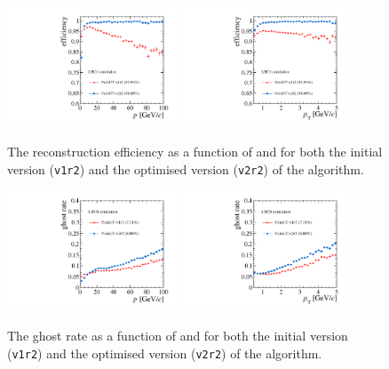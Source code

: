 \begin{figure}[!tb]
\centering
\includegraphics[width=0.45\textwidth]{figs/upstream-tracking-upgrade/eff_p_comp.pdf}
\includegraphics[width=0.45\textwidth]{figs/upstream-tracking-upgrade/eff_pt_comp.pdf}
\caption{The reconstruction efficiency as a function of \ptot and \pt for both the initial version (\texttt{v1r2}) and the optimised version (\texttt{v2r2}) of the \velout algorithm.}
\label{fig:eff_velout_comp}
\end{figure}

\begin{figure}[!tb]
\centering
\includegraphics[width=0.45\textwidth]{figs/upstream-tracking-upgrade/gr_p_comp.pdf}
\includegraphics[width=0.45\textwidth]{figs/upstream-tracking-upgrade/gr_pt_comp.pdf}
\caption{The ghost rate as a function of \ptot and \pt for both the initial version (\texttt{v1r2}) and the optimised version (\texttt{v2r2}) of the \velout algorithm.}
\label{fig:gr_velout_comp}
\end{figure}

